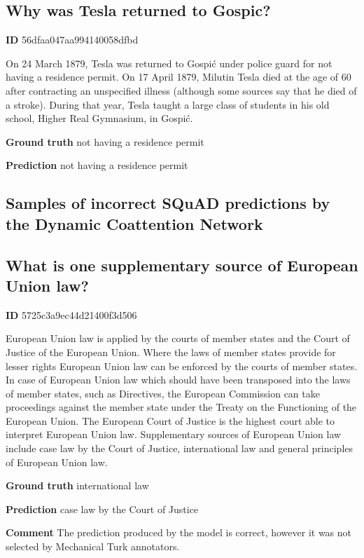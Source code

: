\documentclass{article} \usepackage{iclr2017_conference,times}
\newcommand{\oursfull}{Dynamic Coattention Network\xspace}
\begin{document}
\subsection*{Why was Tesla returned to Gospic?}

\textbf{ID} 56dfaa047aa994140058dfbd

On 24 March 1879, Tesla was returned to Gospić under police guard for not having a residence permit. On 17 April 1879, Milutin Tesla died at the age of 60 after contracting an unspecified illness (although some sources say that he died of a stroke). During that year, Tesla taught a large class of students in his old school, Higher Real Gymnasium, in Gospić.

\textbf{Ground truth}
not having a residence permit

\textbf{Prediction}
not having a residence permit




\subsection{Samples of \textbf{incorrect} SQuAD predictions by the \oursfull}
\label{app:examples}

\subsection*{What is one supplementary source of European Union law?}

\textbf{ID} 5725c3a9ec44d21400f3d506

European Union law is applied by the courts of member states and the Court of Justice of the European Union. Where the laws of member states provide for lesser rights European Union law can be enforced by the courts of member states. In case of European Union law which should have been transposed into the laws of member states, such as Directives, the European Commission can take proceedings against the member state under the Treaty on the Functioning of the European Union. The European Court of Justice is the highest court able to interpret European Union law. Supplementary sources of European Union law include case law by the Court of Justice, international law and general principles of European Union law.

\textbf{Ground truth}
international law

\textbf{Prediction}
case law by the Court of Justice

\textbf{Comment}
The prediction produced by the model is correct, however it was not selected by Mechanical Turk annotators.
\end{document}
